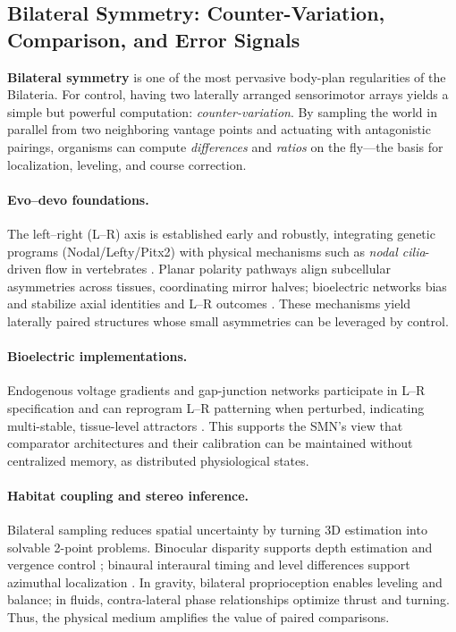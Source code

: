 
\subsection{Bilateral Symmetry: Counter-Variation, Comparison, and Error Signals}
\label{subsec:bilateral}

\textbf{Bilateral symmetry} is one of the most pervasive body-plan regularities of the Bilateria.
For control, having two laterally arranged sensorimotor arrays yields a simple but powerful computation: \emph{counter-variation}.
By sampling the world in parallel from two neighboring vantage points and actuating with antagonistic pairings, organisms can compute \emph{differences} and \emph{ratios} on the fly---the basis for localization, leveling, and course correction.

\paragraph{Evo--devo foundations.}
The left--right (L--R) axis is established early and robustly, integrating genetic programs (Nodal/Lefty/Pitx2) with physical mechanisms such as \emph{nodal cilia}-driven flow in vertebrates \cite{Nonaka1998NodalCilia,Hamada2002LRPatterning}.
Planar polarity pathways align subcellular asymmetries across tissues, coordinating mirror halves; bioelectric networks bias and stabilize axial identities and L--R outcomes \cite{AwLevin2009LRPCP,Levin2014MolecularBioelectricity}.
These mechanisms yield laterally paired structures whose small asymmetries can be leveraged by control.

\paragraph{Bioelectric implementations.}
Endogenous voltage gradients and gap-junction networks participate in L--R specification and can reprogram L--R patterning when perturbed, indicating multi-stable, tissue-level attractors \cite{Levin2014MolecularBioelectricity}.
This supports the SMN's view that comparator architectures and their calibration can be maintained without centralized memory, as distributed physiological states.

\paragraph{Habitat coupling and stereo inference.}
Bilateral sampling reduces spatial uncertainty by turning 3D estimation into solvable 2-point problems.
Binocular disparity supports depth estimation and vergence control \cite{CummingDeAngelis2001Stereopsis}; binaural interaural timing and level differences support azimuthal localization \cite{GrothePeckaMcAlpine2010Localization}.
In gravity, bilateral proprioception enables leveling and balance; in fluids, contra-lateral phase relationships optimize thrust and turning.
Thus, the physical medium amplifies the value of paired comparisons.

